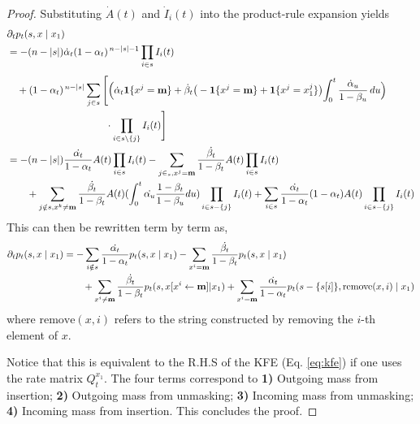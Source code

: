 \begin{proof}
Substituting \(\dot A(t)\) and \(\dot I_i(t)\) into the product-rule expansion yields
\[
\begin{aligned}
&\partial_t p_t(s,x\mid x_1)\\
&=-(n-|s|)\dot\alpha_t(1-\alpha_t)^{\,n-|s|-1}\prod_{i\in s}I_i(t)\\[4pt]
&\quad + (1-\alpha_t)^{\,n-|s|}\sum_{j\in s}\Bigg[
\Big(\dot\alpha_t\mathbf{1}\{x^j=\mathbf{m}\}
+\dot\beta_t\big(-\mathbf{1}\{x^j=\mathbf{m}\}+\mathbf{1}\{x^j=x_1^j\}\big)
\!\int_0^t\frac{\dot\alpha_u}{1-\beta_u}\,du\Big)\\
&\qquad\qquad\qquad\qquad\qquad\cdot\prod_{i\in s\setminus\{j\}}I_i(t)
\Bigg] \\ 
&= -(n-|s|) \frac{\dot{\alpha_t}}{1-\alpha_t} A(t) \prod_{i\in s} I_i(t) - \sum_{j\in_s, x^j=\mathbf{m}} \frac{\dot{\beta_t}}{1-\beta_t} A(t) \prod_{i\in s} I_i(t) \\
&\quad\quad + \sum_{j\notin s, x^k\neq\mathbf{m}} \frac{\dot{\beta_t}}{1-\beta_t} A(t) (\int_0^t \dot{\alpha_u} \frac{1-\beta_t}{1-\beta_u}du)\prod_{i\in s - \{j\}}I_i(t)
+\sum_{i\in s} \frac{\dot{\alpha_t}}{1-\alpha_t} (1-\alpha_t) A(t) \prod_{i\in s-\{j\}} I_i(t) \end{aligned}
\]
This can then be rewritten term by term as,
\[
\begin{aligned}
    \partial_t p_t(s, x \mid x_1) &= - \sum_{i\notin s} \frac{\dot{\alpha_t}}{1-\alpha_t} p_t(s, x \mid x_1) - \sum_{x^i=\mathbf{m}} \frac{\dot{\beta_t}}{1-\beta_t} p_t(s, x \mid x_1) \\ &\quad\quad+ \sum_{x^i \neq \mathbf{m}} \frac{\dot{\beta_t}}{1-\beta_t} p_t(s, x[x^{i} \leftarrow \mathbf{m}] | x_1) + \sum_{x^i=\mathbf{m}} \frac{\dot{\alpha_t}}{1-\alpha_t} p_t(s - \{s[i]\}, \text{remove}(x, i) \mid x_1)
\end{aligned}
\]
where $\text{remove}(x, i)$ refers to the string constructed by removing the $i$-th element of $x$.

Notice that this is equivalent to the R.H.S of the KFE (Eq. \ref{eq:kfe}) if one uses the rate matrix $Q_t^{x_1}$. The four terms correspond to \textbf{1)} Outgoing mass from insertion; \textbf{2)} Outgoing mass from unmasking; \textbf{3)} Incoming mass from unmasking; \textbf{4)} Incoming mass from insertion. This concludes the proof. 
\end{proof}



